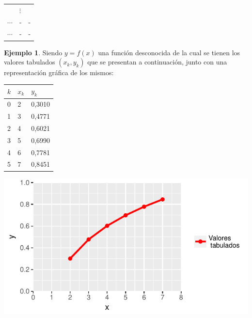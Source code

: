 \documentclass[]{book}
\begin{document}
\begin{longtable}[]{@{}lll@{}}
\begin{minipage}[t]{0.43\columnwidth}
\end{minipage} & \begin{minipage}[t]{0.41\columnwidth}\raggedright
\(\vdots\)\strut
\end{minipage}\tabularnewline
\begin{minipage}[t]{0.07\columnwidth}\raggedright
\(\cdots\)\strut
\end{minipage} & \begin{minipage}[t]{0.43\columnwidth}\raggedright
-\strut
\end{minipage} & \begin{minipage}[t]{0.41\columnwidth}\raggedright
-\strut
\end{minipage}\tabularnewline
\begin{minipage}[t]{0.07\columnwidth}\raggedright
\(\cdots\)\strut
\end{minipage} & \begin{minipage}[t]{0.43\columnwidth}\raggedright
-\strut
\end{minipage} & \begin{minipage}[t]{0.41\columnwidth}\raggedright
-\strut
\end{minipage}\tabularnewline
\bottomrule
\end{longtable}

\textbf{Ejemplo 1}. Siendo \(y=f(x)\) una función desconocida de la cual se tienen los valores tabulados \((x_k, y_k)\) que se presentan a continuación, junto con una representación gráfica de los mismos:

\begin{longtable}[]{@{}lll@{}}
\toprule
\(k\) & \(x_k\) & \(y_k\)\tabularnewline
\midrule
\endhead
0 & 2 & 0,3010\tabularnewline
1 & 3 & 0,4771\tabularnewline
2 & 4 & 0,6021\tabularnewline
3 & 5 & 0,6990\tabularnewline
4 & 6 & 0,7781\tabularnewline
5 & 7 & 0,8451\tabularnewline
\bottomrule
\end{longtable}

\begin{center}\includegraphics[width=1\linewidth]{Plots/U4/Unidad4_g1} \end{center}
\end{document}
